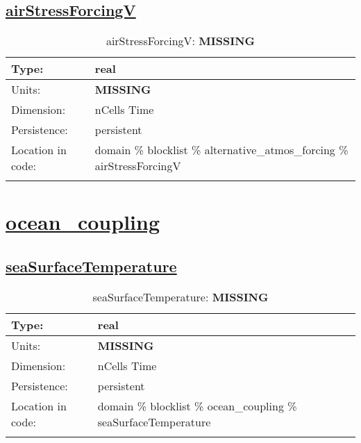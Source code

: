 \subsection[airStressForcingV]{\hyperref[sec:var_tab_alternative_atmos_forcing]{airStressForcingV}}
\label{subsec:var_sec_alternative_atmos_forcing_airStressForcingV}
\begin{center}
\begin{longtable}{| p{2.0in} | p{4.0in} |}
        \hline 
        Type: & real \\
        \hline 
        Units: & {\bf \color{red} MISSING} \\
        \hline 
        Dimension: & nCells Time \\
        \hline 
        Persistence: & persistent \\
        \hline 
         Location in code: & domain \% blocklist \% alternative\_atmos\_forcing \% airStressForcingV \\
         \hline 
    \caption{airStressForcingV: {\bf \color{red} MISSING}}
\end{longtable}
\end{center}
\section[ocean\_coupling]{\hyperref[sec:var_tab_ocean_coupling]{ocean\_coupling}}
\label{sec:var_sec_ocean_coupling}
\subsection[seaSurfaceTemperature]{\hyperref[sec:var_tab_ocean_coupling]{seaSurfaceTemperature}}
\label{subsec:var_sec_ocean_coupling_seaSurfaceTemperature}
\begin{center}
\begin{longtable}{| p{2.0in} | p{4.0in} |}
        \hline 
        Type: & real \\
        \hline 
        Units: & {\bf \color{red} MISSING} \\
        \hline 
        Dimension: & nCells Time \\
        \hline 
        Persistence: & persistent \\
        \hline 
         Location in code: & domain \% blocklist \% ocean\_coupling \% seaSurfaceTemperature \\
         \hline 
    \caption{seaSurfaceTemperature: {\bf \color{red} MISSING}}
\end{longtable}
\end{center}
